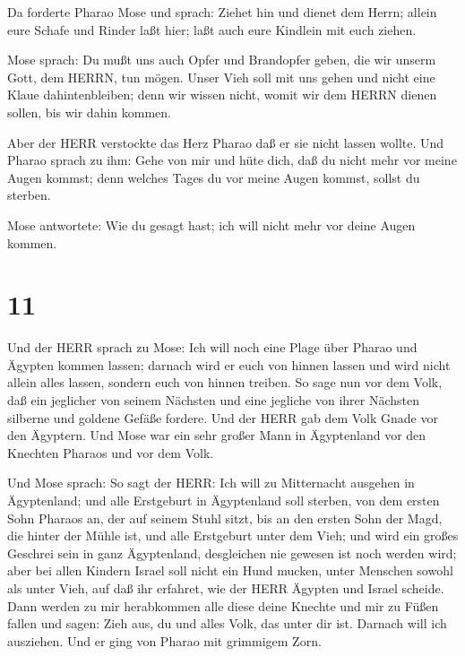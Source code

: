  Da forderte Pharao Mose und sprach: Ziehet hin und dienet
dem Herrn; allein eure Schafe und Rinder laßt hier; laßt auch eure
Kindlein mit euch ziehen.

 Mose sprach: Du mußt uns auch Opfer und Brandopfer geben,
die wir unserm Gott, dem HERRN, tun mögen.  Unser Vieh soll
mit uns gehen und nicht eine Klaue dahintenbleiben; denn wir wissen
nicht, womit wir dem HERRN dienen sollen, bis wir dahin kommen.

 Aber der HERR verstockte das Herz Pharao daß er sie nicht
lassen wollte.  Und Pharao sprach zu ihm: Gehe von mir und
hüte dich, daß du nicht mehr vor meine Augen kommst; denn welches Tages
du vor meine Augen kommst, sollst du sterben.

 Mose antwortete: Wie du gesagt hast; ich will nicht mehr
vor deine Augen kommen.

\hypertarget{section-10}{%
\section{11}\label{section-10}}

 Und der HERR sprach zu Mose: Ich will noch eine Plage über
Pharao und Ägypten kommen lassen; darnach wird er euch von hinnen lassen
und wird nicht allein alles lassen, sondern euch von hinnen treiben.
 So sage nun vor dem Volk, daß ein jeglicher von seinem
Nächsten und eine jegliche von ihrer Nächsten silberne und goldene
Gefäße fordere.  Und der HERR gab dem Volk Gnade vor den
Ägyptern. Und Mose war ein sehr großer Mann in Ägyptenland vor den
Knechten Pharaos und vor dem Volk.

 Und Mose sprach: So sagt der HERR: Ich will zu Mitternacht
ausgehen in Ägyptenland;  und alle Erstgeburt in Ägyptenland
soll sterben, von dem ersten Sohn Pharaos an, der auf seinem Stuhl
sitzt, bis an den ersten Sohn der Magd, die hinter der Mühle ist, und
alle Erstgeburt unter dem Vieh;  und wird ein großes
Geschrei sein in ganz Ägyptenland, desgleichen nie gewesen ist noch
werden wird;  aber bei allen Kindern Israel soll nicht ein
Hund mucken, unter Menschen sowohl als unter Vieh, auf daß ihr erfahret,
wie der HERR Ägypten und Israel scheide.  Dann werden zu mir
herabkommen alle diese deine Knechte und mir zu Füßen fallen und sagen:
Zieh aus, du und alles Volk, das unter dir ist. Darnach will ich
ausziehen. Und er ging von Pharao mit grimmigem Zorn.

